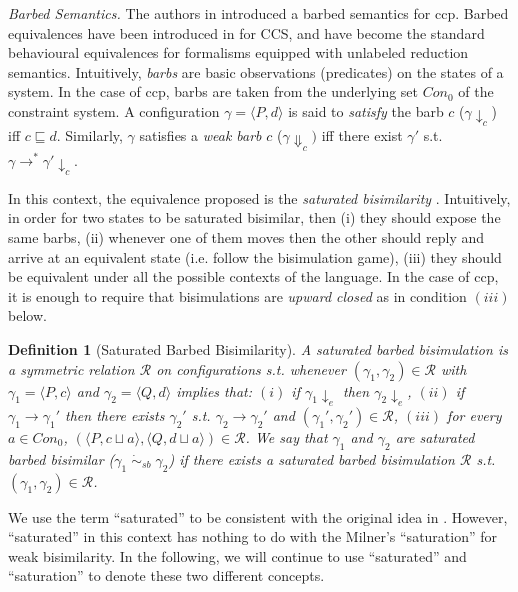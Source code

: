 \documentclass[copyright,creativecommons]{eptcs}
\newcommand{\rrarrow}{\longrightarrow}
\newcommand{\Con}{\mathit{Con}}
\newcommand{\pairccp}[2]{\langle #1,#2 \rangle}
\newcommand{\trans}[1]{\stackrel{#1}{\rrarrow}}
\newcommand{\barb}[1]{\downarrow_{#1}}
\newcommand{\wbarb}[1]{\Downarrow_{#1}}
\newcommand{\satbis}{\dot{\sim}_{sb}}
\newtheorem{definition}{Definition}
\newcommand{\reds}{\rrarrow^*}
\newcommand{\R}{\mathcal{R}}
\newcommand{\G}{\gamma}
\newcommand{\conf}[2]{\pairccp{#1}{#2}}
\begin{document}
\emph{Barbed Semantics.}\label{sec:barbsem}
The authors in \cite{Aristizabal:11:FOSSACS} introduced a  barbed semantics for ccp.
Barbed equivalences have been introduced in \cite{Milner:92:ICALP}
for CCS, and  have become the standard behavioural equivalences for
formalisms equipped with unlabeled reduction semantics. Intuitively,
\emph{barbs} are basic observations (predicates) on the states of a
system. In the case of ccp, barbs are taken from the underlying set $\Con_0$ of the constraint system.
A configuration $\gamma=\pairccp{P}{d}$ is said to \emph{satisfy} the barb $c$
($\gamma \downarrow_c$) iff $c \sqsubseteq d$. Similarly, $\G$ satisfies
a \emph{weak barb} $c$ ($\G\wbarb{c})$ iff there exist $\G'$ s.t. $\G \reds \G'\barb{c}$.

In this context, the equivalence proposed is the
\emph{saturated bisimilarity} \cite{Bonchi:06:LICS, Bonchi:09:FOSSACS}. Intuitively, in order for two states to be saturated bisimilar, then (i) they should expose the same barbs,
(ii) whenever one of them moves then the other should reply and arrive at an equivalent state (i.e. follow the bisimulation game),
(iii) they should be equivalent under all the possible contexts of the language.
In the case of ccp, it is enough to require that bisimulations are \emph{upward closed} as in condition $(iii)$ below.

\begin{definition}[Saturated Barbed Bisimilarity]
\label{def:satbarbbis}
A saturated barbed bisimulation is a symmetric relation
$\R$ on configurations s.t. whenever
$(\gamma_1, \gamma_2) \in \R$  with $\gamma_1=\conf{P}{c}$ and $\gamma_2=\conf{Q}{d}$ implies that:
$(i)$ if $\gamma_1 \downarrow_e$ then $\gamma_2 \downarrow_e$,
$(ii)$ if $\gamma_1 \trans{} \gamma_1'$ then there exists
$\gamma_2'$ s.t. $\gamma_2 \trans{} \gamma_2'$ and $(\gamma_1',
\gamma_2') \in \R$,
$(iii)$ for every $a\in \Con_0$, $(\pairccp{P}{c \sqcup a},
\pairccp{Q}{d \sqcup a}) \in \mathcal{R}$.
We say that  $\gamma_1$ and $\gamma_2$ are saturated barbed bisimilar ($\gamma_1  \;
\satbis \; \gamma_2$) if there exists a saturated barbed bisimulation $\R$ s.t.
$(\gamma_1,\gamma_2) \in \mathcal{R}$.
\end{definition}

We use the term ``saturated'' to be consistent with the original idea in \cite{Bonchi:06:LICS, Bonchi:09:FOSSACS}.
However, ``saturated'' in this context has nothing to do with the Milner's ``saturation'' for weak bisimilarity.
In the following, we will continue to use ``saturated'' and ``saturation'' to denote these two different concepts.
\end{document}

